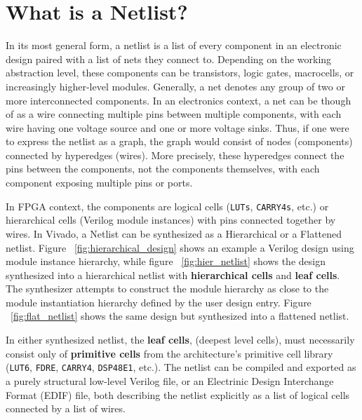 \section{What is a Netlist?}
\label{sec:netlist}
In its most general form, a netlist is a list of every component in an electronic design paired with a list of nets they connect to. 
Depending on the working abstraction level, these components can be transistors, logic gates, macrocells, or increasingly higher-level modules. 
Generally, a net denotes any group of two or more interconnected components.
In an electronics context, a net can be though of as a wire connecting multiple pins between multiple components, with each wire having one voltage source and one or more voltage sinks. 
Thus, if one were to express the netlist as a graph, the graph would consist of nodes (components) connected by hyperedges (wires). 
More precisely, these hyperedges connect the pins between the components, not the components themselves, with each component exposing multiple pins or ports. 

In FPGA context, the components are logical cells (\texttt{LUTs}, \texttt{CARRY4s}, etc.) or hierarchical cells (Verilog module instances) with pins connected together by wires. 
In Vivado, a Netlist can be synthesized as a Hierarchical or a Flattened netlist. 
Figure ~\ref{fig:hierarchical_design} shows an example a Verilog design using module instance hierarchy, while figure ~\ref{fig:hier_netlist} shows the design synthesized into a hierarchical netlist with \textbf{hierarchical cells} and \textbf{leaf cells}. 
The synthesizer attempts to construct the module hierarchy as close to the module instantiation hierarchy defined by the user design entry. 
Figure ~\ref{fig:flat_netlist} shows the same design but synthesized into a flattened netlist. 

In either synthesized netlist, the \textbf{leaf cells}, (deepest level cells), must necessarily consist only of \textbf{primitive cells} from the architecture's primitive cell library (\texttt{LUT6}, \texttt{FDRE}, \texttt{CARRY4}, \texttt{DSP48E1}, etc.). 
The netlist can be compiled and exported as a purely structural low-level Verilog file, or an Electrinic Design Interchange Format (EDIF) file, both describing the netlist explicitly as a list of logical cells connected by a list of wires. 

